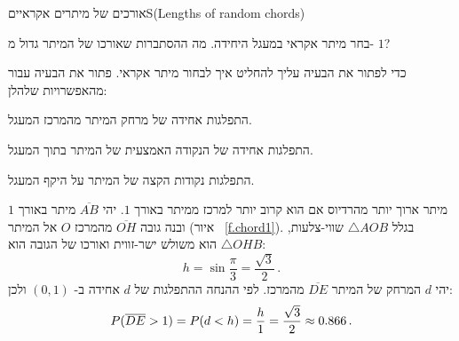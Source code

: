 \begin{prob}{אורכים של מיתרים אקראיים}{S}{(Lengths of random chords)}

בחר מיתר אקראי במעגל היחידה. מה ההסתברות שאורכו של המיתר גדול מ-%
$1$?

כדי לפתור את הבעיה עליך להחליט איך לבחור מיתר אקראי. פתור את הבעיה עבור מהאפשרויות שלהלן:

התפלגות אחידה של מרחק המיתר מהמרכז המעגל.

התפלגות אחידה של הנקודה האמצעית של המיתר בתוך המעגל.

התפלגות נקודות הקצה של המיתר על היקף המעגל.
\end{prob}
\solution{}

מיתר ארוך יותר מהרדיוס אם הוא קרוב יותר למרכז ממיתר באורך 
$1$.
יהי 
$\overline{AB}$
מיתר באורך 
$1$
ובנה
גובה
$\overline{OH}$
מהמרכז 
$O$
אל המיתר (איור%
~\ref{f.chord1}). 
בגלל 
$\triangle AOB$
שווי-צלעות,
$\triangle OHB$ 
הוא משולש ישר-זווית ואורכו של הגובה הוא:
\[
h = \sin \frac{\pi}{3} = \frac{\sqrt{3}}{2}\,.
\]
יהי
$d$
המרחק של המיתר 
$\overline{DE}$
מהמרכז. לפי ההנחה ההתפלגות של
$d$
אחידה ב-%
$(0,1)$
ולכן:
\[
P(\overline{DE}>1)=P(d<h)=\displaystyle\frac{h}{1}=\frac{\sqrt{3}}{2} \approx 0.866\,.
\]

